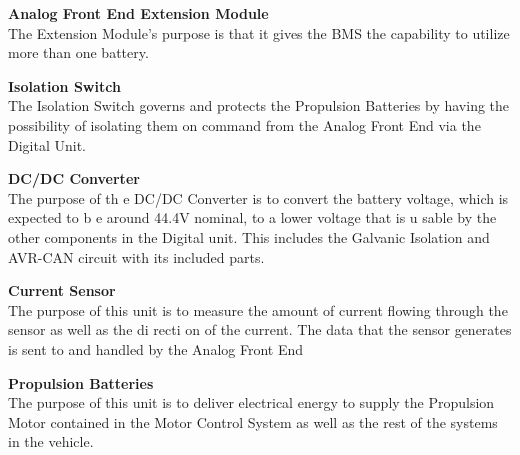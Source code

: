 \textbf{Analog Front End Extension Module}\\
The Extension Module's purpose is that it gives the BMS the capability to utilize more than one battery.

\textbf{Isolation Switch}\\
The Isolation Switch governs and protects the Propulsion Batteries by having the possibility of isolating them on command from the Analog Front End via the Digital Unit. 

\textbf{DC/DC Converter}\\
The purpose of th e DC/DC Converter is to convert the battery voltage, which is expected to b e around 44.4V nominal, to a lower voltage that is u sable by the other components in the Digital unit. This includes the Galvanic Isolation and AVR-CAN circuit with its included parts.

\textbf{Current Sensor}\\
The purpose of this unit is to measure the amount of current flowing through the sensor
as well as the di recti on of the current. The data that the sensor generates is sent to and
handled by the Analog Front End

\textbf{Propulsion Batteries}\\
The purpose of this unit is to deliver electrical energy to supply the Propulsion Motor contained in the Motor Control System as well as the rest of the systems in the vehicle.